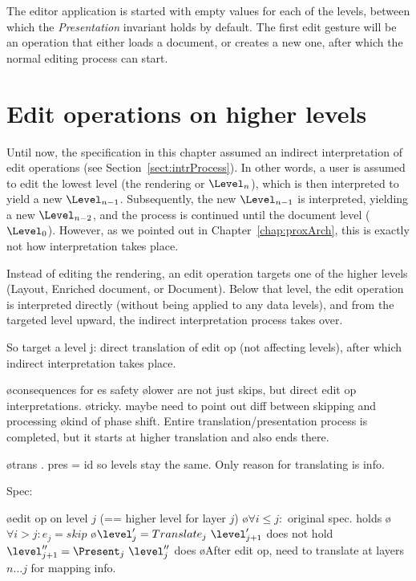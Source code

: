 The editor application is started with empty values for each of the levels, between which the {\em Presentation} invariant holds by default. The first edit gesture will be an operation that either loads a document, or creates a new one, after which the normal editing process can start.


%																
%																
%																
\section{Edit operations  on higher levels} \label{sect:specHigherEdit}

Until now, the specification in this chapter assumed an indirect interpretation of edit operations (see Section~\ref{sect:intrProcess}). In other words, a user is assumed to edit the lowest level (the rendering or $\Level_n$), which is then interpreted to yield a new $\Level_{n-1}$. Subsequently, the new $\Level_{n-1}$ is interpreted, yielding a new $\Level_{n-2}$, and the process is continued until the document level ($\Level_0$). However, as we pointed out in Chapter~\ref{chap:proxArch}, this is exactly not how interpretation takes place.

\toHere     %

Instead of editing the rendering, an edit operation targets one of the higher levels (Layout, Enriched document, or Document). Below that level, the edit operation is interpreted directly (without being applied to any data levels), and from the targeted level upward, the indirect interpretation process takes over.

So target a level j: direct translation of edit op (not affecting levels), after which indirect interpretation takes place.

\bl
\o consequences for es safety
\o lower are not just skips, but direct edit op interpretations.
\o tricky. maybe need to point out diff between skipping and processing
\o kind of phase shift. Entire translation/presentation process is completed, but it starts at higher translation and also ends there.
\el

\bl
\o trans . pres = id so levels stay the same. Only reason for translating is info.
\el

Spec:

\bl
\o edit op on level $j$ (== higher level for layer $j$)
\o $\forall i\le j:$ original spec. holds
\o $\forall i>j: e_j = skip$ 
\o $\level'_j = Translate_j~\level'_{j+1}$ does not hold $\level''_{j+1} = \Present_j~\level''_j$ does
\o After edit op, need to translate at layers $n\dots j$ for mapping info.
\el 

